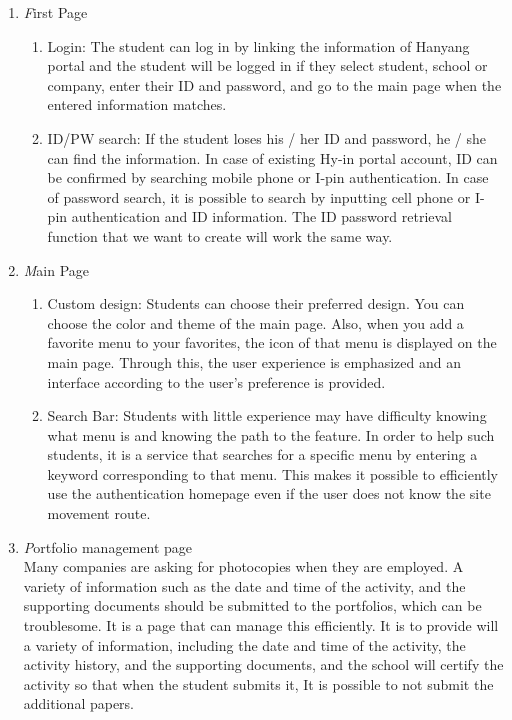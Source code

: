 \documentclass[conference]{IEEEtran}
\begin{document}
\begin{enumerate}
	\item \textit First Page
    \begin{enumerate}
    	\item Login: The student can log in by linking the information of Hanyang portal and the student will be logged in if they select student, school or company, enter their ID and password, and go to the main page when the entered information matches.\\
        \item ID/PW search: If the student loses his / her ID and password, he / she can find the information. In case of existing Hy-in portal account, ID can be confirmed by searching mobile phone or I-pin authentication. In case of password search, it is possible to search by inputting cell phone or I-pin authentication and ID information. The ID password retrieval function that we want to create will work the same way.\\
    \end{enumerate}
    \item \textit Main Page
    \begin{enumerate}
    	\item Custom design: Students can choose their preferred design. You can choose the color and theme of the main page. Also, when you add a favorite menu to your favorites, the icon of that menu is displayed on the main page. Through this, the user experience is emphasized and an interface according to the user's preference is provided.\\
        \item Search Bar: Students with little experience may have difficulty knowing what menu is and knowing the path to the feature. In order to help such students, it is a service that searches for a specific menu by entering a keyword corresponding to that menu. This makes it possible to efficiently use the authentication homepage even if the user does not know the site movement route.\\
    \end{enumerate}
    \item \textit Portfolio management page\\
    Many companies are asking for photocopies when they are employed. A variety of information such as the date and time of the activity, and the supporting documents should be submitted to the portfolios, which can be troublesome. It is a page that can manage this efficiently. It is to provide will a variety of information, including the date and time of the activity, the activity history, and the supporting documents, and the school will certify the activity so that when the student submits it, It is possible to not submit the additional papers.\\

\end{enumerate}
\end{document}
